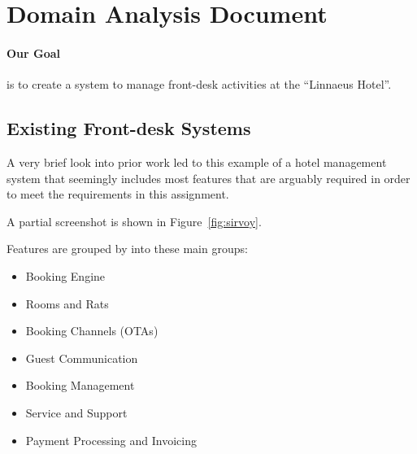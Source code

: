 %
%
%


\section{Domain Analysis Document}
% 

\paragraph{Our Goal}
is to create a system to manage front-desk activities at the ``Linnaeus Hotel''.


\subsection{Existing Front-desk Systems}
A very brief look into prior work led to this \cite{2dv603:assignment1-sirvoy}
example of a hotel management system that seemingly includes most features that
are arguably required in order to meet the requirements in this assignment.

A partial screenshot is shown in Figure~\ref{fig:sirvoy}.

Features are grouped by into these main groups:

\begin{itemize}
  \item Booking Engine
  \item Rooms and Rats
  \item Booking Channels (OTAs)
  \item Guest Communication
  \item Booking Management
  \item Service and Support
  \item Payment Processing and Invoicing
\end{itemize}

